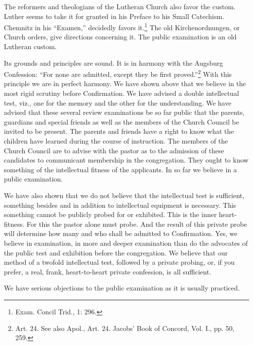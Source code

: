 The reformers and theologians of the Lutheran Church also favor the custom. Luther seems to take it for granted in his Preface to his Small Catechism. Chemnitz in his “Examen,” decidedly favors it.\footnote{Exam. Concil Trid., 1: 296.} The old Kirchenordnungen, or Church orders, give directions concerning it. The public examination is an old Lutheran custom. 

 Its grounds and principles are sound. It is in harmony with the Augsburg Confession: “For none are admitted, except they be first proved.”\footnote{Art. 24. See also Apol., Art. 24. Jacobs’ Book of Concord, Vol. I., pp. 50, 259.} With
this principle we are in perfect harmony. We have shown above that we believe in the most rigid scrutiny before Confirmation. We have advised a double intellectual test, viz., one for the memory and the other for the understanding. We have advised that these several review examinations be so far public that the parents, guardians and special friends as well as the members of the Church Council be invited to be present. The parents and friends have a right to know what the children have learned during the course of instruction. The members of the Church Council are to advise with the pastor as to the admission of these candidates to communicant membership in the congregation. They ought to know something of the intellectual fitness of the applicants. In so far we believe in a public examination. 

We have also shown that we do not believe that the intellectual test is sufficient, something besides and in addition to intellectual equipment is necessary. This something cannot be publicly probed for or exhibited. This is the inner heart-fitness. For this the pastor alone must probe. And the result of this private probe will determine how many and who shall be admitted to Confirmation. Yes, we believe in examination, in more and deeper examination than do the advocates of the public test and exhibition before the congregation. We believe
that our method of a twofold intellectual test, followed by a private probing, or, if you prefer, a real, frank, heart-to-heart private confession, is all sufficient. 

We have serious objections to the public examination as it is usually practiced. 

